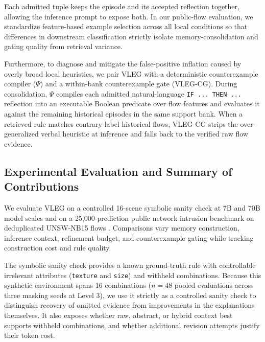 \documentclass[10pt,a4paper,onecolumn]{article}
\theoremstyle{definition}
\theoremstyle{remark}
\begin{document}
Each admitted tuple keeps the episode and its accepted reflection together, allowing the inference prompt to expose both. In our public-flow evaluation, we standardize feature-based example selection across all local conditions so that differences in downstream classification strictly isolate memory-consolidation and gating quality from retrieval variance.

Furthermore, to diagnose and mitigate the false-positive inflation caused by overly broad local heuristics, we pair VLEG with a deterministic counterexample compiler ($\Psi$) and a within-bank counterexample gate (VLEG-CG). During consolidation, $\Psi$ compiles each admitted natural-language \texttt{IF ... THEN ...} reflection into an executable Boolean predicate over flow features and evaluates it against the remaining historical episodes in the same support bank. When a retrieved rule matches contrary-label historical flows, VLEG-CG strips the over-generalized verbal heuristic at inference and falls back to the verified raw flow evidence.

\subsection{Experimental Evaluation and Summary of Contributions}
We evaluate VLEG on a controlled 16-scene symbolic sanity check at 7B and 70B model scales and on a 25,000-prediction public network intrusion benchmark on deduplicated UNSW-NB15 flows \cite{moustafa2015unsw}. Comparisons vary memory construction, inference context, refinement budget, and counterexample gating while tracking construction cost and rule quality.

The symbolic sanity check provides a known ground-truth rule with controllable irrelevant attributes (\texttt{texture} and \texttt{size}) and withheld combinations. Because this synthetic environment spans 16 combinations ($n=48$ pooled evaluations across three masking seeds at Level 3), we use it strictly as a controlled sanity check to distinguish recovery of omitted evidence from improvements in the explanations themselves. It also exposes whether raw, abstract, or hybrid context best supports withheld combinations, and whether additional revision attempts justify their token cost.
\end{document}

